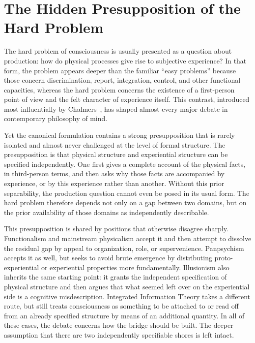 \documentclass[12pt]{article}
\theoremstyle{definition}
\theoremstyle{remark}
\begin{document}
\clearpage
\tableofcontents
\clearpage

%
\section{The Hidden Presupposition of the Hard
Problem}\label{the-hidden-presupposition-of-the-hard-problem}

The hard problem of consciousness is usually presented as a question
about production: how do physical processes give rise to subjective
experience? In that form, the problem appears deeper than the familiar
``easy problems'' because those concern discrimination, report,
integration, control, and other functional capacities, whereas the hard
problem concerns the existence of a first-person point of view and the
felt character of experience itself. This contrast, introduced most
influentially by Chalmers~\cite{Chalmers1996}, has shaped almost every major debate in
contemporary philosophy of mind.

Yet the canonical formulation contains a strong presupposition that is
rarely isolated and almost never challenged at the level of formal
structure. The presupposition is that physical structure and
experiential structure can be specified independently. One first gives a
complete account of the physical facts, in third-person terms, and then
asks why those facts are accompanied by experience, or by this
experience rather than another. Without this prior separability, the
production question cannot even be posed in its usual form. The hard
problem therefore depends not only on a gap between two domains, but on
the prior availability of those domains as independently describable.

This presupposition is shared by positions that otherwise disagree
sharply. Functionalism and mainstream physicalism accept it and then
attempt to dissolve the residual gap by appeal to organization, role, or
supervenience. Panpsychism accepts it as well, but seeks to avoid brute
emergence by distributing proto-experiential or experiential properties
more fundamentally. Illusionism also inherits the same starting point:
it grants the independent specification of physical structure and then
argues that what seemed left over on the experiential side is a
cognitive misdescription. Integrated Information Theory takes a
different route, but still treats consciousness as something to be
attached to or read off from an already specified structure by means of
an additional quantity. In all of these cases, the debate concerns how
the bridge should be built. The deeper assumption that there are two
independently specifiable shores is left intact.
\end{document}

